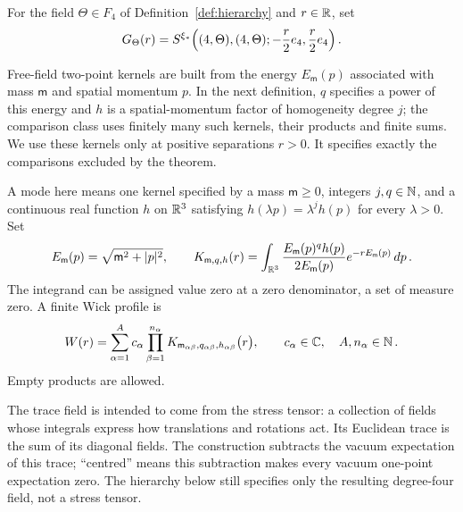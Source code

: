 \begin{definition}\label{def:trace-pair}
For the field $\Theta\in F_4$ of Definition~\ref{def:hierarchy} and $r\in\mathbb R$, set
\begin{equation}\label{eq:trace-pair}
G_\Theta(r)=S^{\xi_*}\Bigl((4,\Theta),(4,\Theta);-\frac{r}{2}e_4,\frac{r}{2}e_4\Bigr)\,.
\end{equation}
\end{definition}

Free-field two-point kernels are built from the energy $E_{\mathsf m}(p)$ associated with mass $\mathsf m$ and spatial momentum $p$.
In the next definition, $q$ specifies a power of this energy and $h$ is a spatial-momentum factor of homogeneity degree $j$; the comparison class uses finitely many such kernels, their products and finite sums.
We use these kernels only at positive separations $r>0$.
It specifies exactly the comparisons excluded by the theorem.

\begin{definition}\label{def:wick}
A mode here means one kernel specified by a mass $\mathsf m\ge0$, integers $j,q\in\mathbb N$, and a continuous real function $h$ on $\mathbb R^3$ satisfying $h(\lambda p)=\lambda^jh(p)$ for every $\lambda>0$.
Set
\begin{equation}\label{eq:mode}
E_{\mathsf m}(p)=\sqrt{\mathsf m^2+|p|^2},
\qquad K_{\mathsf m,q,h}(r)=\int_{\mathbb R^3}\frac{E_{\mathsf m}(p)^qh(p)}{2E_{\mathsf m}(p)}e^{-rE_{\mathsf m}(p)}\,dp\,.
\end{equation}
The integrand can be assigned value zero at a zero denominator, a set of measure zero.
A finite Wick profile is
\begin{equation}\label{eq:wick}
W(r)=\sum_{\alpha=1}^A c_\alpha\prod_{\beta=1}^{n_\alpha}
 K_{\mathsf m_{\alpha\beta},q_{\alpha\beta},h_{\alpha\beta}}\bigl(r\bigr),
\qquad c_\alpha\in\mathbb C,\quad A,n_\alpha\in\mathbb N\,.
\end{equation}
Empty products are allowed.
\end{definition}

The trace field is intended to come from the stress tensor: a collection of fields whose integrals express how translations and rotations act.
Its Euclidean trace is the sum of its diagonal fields.
The construction subtracts the vacuum expectation of this trace; “centred” means this subtraction makes every vacuum one-point expectation zero.
The hierarchy below still specifies only the resulting degree-four field, not a stress tensor.

